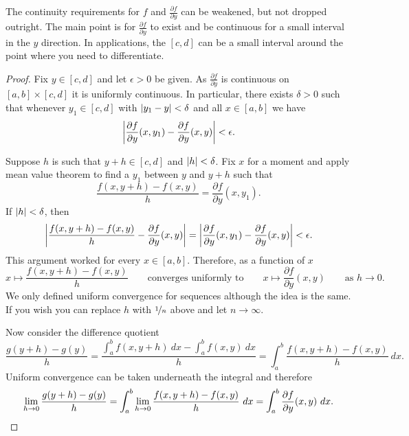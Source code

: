 The continuity requirements for $f$ and
$\frac{\partial f}{\partial y}$ can be
weakened, but not dropped outright.  The main point is for
$\frac{\partial f}{\partial y}$ to exist and be continuous for a small
interval in the $y$ direction.  In applications, the $[c,d]$ can be a
small interval around the point where you need to differentiate.

\begin{proof}
Fix $y \in [c,d]$ and let $\epsilon > 0$ be given.
As $\frac{\partial f}{\partial y}$ is continuous on $[a,b] \times [c,d]$ it
is uniformly continuous.  In particular, there exists $\delta > 0$ such that
whenever $y_1 \in [c,d]$ with
$\left\lvert {y_1-y} \right\rvert < \delta$ and all $x \in [a,b]$ we have
\begin{equation*}
\left\lvert {\frac{\partial f}{\partial y}(x,y_1)-\frac{\partial f}{\partial y}(x,y)} \right\rvert < \epsilon .
\end{equation*}

Suppose $h$ is such that $y+h \in [c,d]$ and $\left\lvert {h} \right\rvert < \delta$.
Fix $x$ for a moment
and apply mean value theorem to find a $y_1$ between $y$ and $y+h$ such that
\begin{equation*}
\frac{f(x,y+h)-f(x,y)}{h}
=
\frac{\partial f}{\partial y}(x,y_1) .
\end{equation*}
If $\left\lvert {h} \right\rvert < \delta$, then
\begin{equation*}
\left\lvert {
\frac{f(x,y+h)-f(x,y)}{h}
-
\frac{\partial f}{\partial y}(x,y) 
} \right\rvert
=
\left\lvert {
\frac{\partial f}{\partial y}(x,y_1) 
-
\frac{\partial f}{\partial y}(x,y) 
} \right\rvert
< \epsilon .
\end{equation*}
This argument worked for every $x \in [a,b]$.  Therefore, as a function of
$x$
\begin{equation*}
x \mapsto \frac{f(x,y+h)-f(x,y)}{h}
\qquad
\text{converges uniformly to}
\qquad
x \mapsto \frac{\partial f}{\partial y}(x,y)
\qquad
\text{as $h \to 0$} .
\end{equation*}
We only defined uniform convergence for sequences although the idea is the
same.  If you wish you can replace $h$ with $\nicefrac{1}{n}$ above and let
$n \to \infty$.

Now consider the difference quotient
\begin{equation*}
\frac{g(y+h)-g(y)}{h}
=
\frac{\int_a^b f(x,y+h) ~dx -
\int_a^b f(x,y) ~dx }{h}
=
\int_a^b \frac{f(x,y+h)-f(x,y)}{h} ~dx .
\end{equation*}
Uniform convergence can be taken underneath the integral and therefore
\begin{equation*}
\lim_{h\to 0}
\frac{g(y+h)-g(y)}{h}
= 
\int_a^b 
\lim_{h\to 0}
\frac{f(x,y+h)-f(x,y)}{h} ~dx 
=
\int_a^b 
\frac{\partial f}{\partial y}(x,y) ~dx . \qedhere
\end{equation*}
\end{proof}

